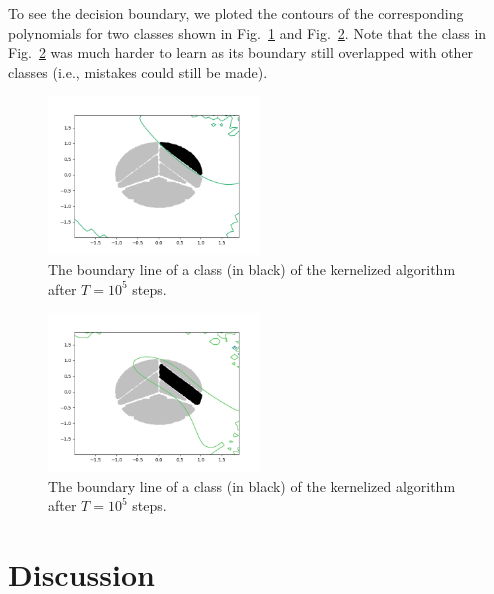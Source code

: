 To see the decision boundary, we ploted the contours of the corresponding polynomials for two classes shown in Fig.~\ref{fig:bound_line1} and Fig.~\ref{fig:bound_line2}.  Note that the class in Fig.~\ref{fig:bound_line2} was much harder to learn as its boundary still overlapped with other classes (i.e., mistakes could still be made).


\begin{figure}[hbt!]
\centering
\includegraphics[width=0.5\textwidth]{Figure_7.png}
\caption{
The boundary line of a class (in black) of the kernelized algorithm after $T=10^5$ steps. 
}
\label{fig:bound_line1}
\end{figure}

\begin{figure}[hbt!]
\centering
\includegraphics[width=0.5\textwidth]{Figure_6.png}
\caption{
The boundary line of a class (in black) of the kernelized algorithm after $T=10^5$ steps.
}
\label{fig:bound_line2}
\end{figure}

\section{Discussion}